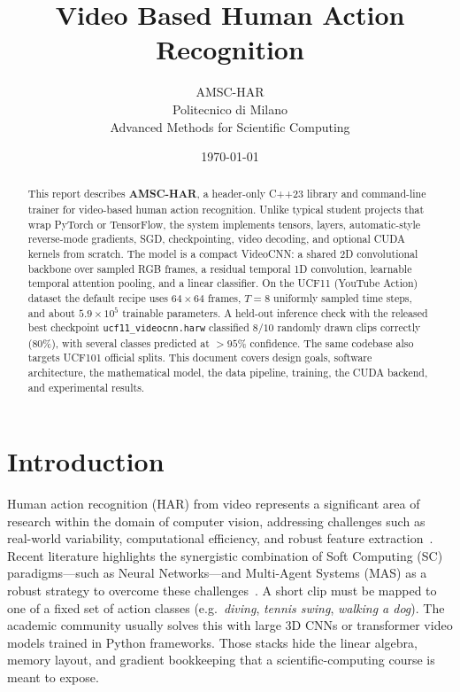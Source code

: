 \documentclass[11pt,a4paper]{article}
\title{\textbf{Video Based Human Action Recognition}}
\author{AMSC-HAR\\
Politecnico di Milano\\
Advanced Methods for Scientific Computing}
\date{\today}
\begin{document}
\maketitle
\vspace{-1.2em}

\begin{abstract}
This report describes \textbf{AMSC-HAR}, a header-only C++23 library and
command-line trainer for video-based human action recognition.
Unlike typical student projects that wrap PyTorch or TensorFlow, the system
implements tensors, layers, automatic-style reverse-mode gradients, SGD,
checkpointing, video decoding, and optional CUDA kernels from scratch.
The model is a compact VideoCNN: a shared 2D convolutional backbone over
sampled RGB frames, a residual temporal 1D convolution, learnable temporal
attention pooling, and a linear classifier.
On the UCF11 (YouTube Action) dataset the default recipe uses $64\times 64$
frames, $T=8$ uniformly sampled time steps, and about $5.9\times 10^5$
trainable parameters.
A held-out inference check with the released best checkpoint
\texttt{ucf11\_videocnn.harw} classified $8/10$ randomly drawn clips
correctly (80\%), with several classes predicted at $>95\%$ confidence.
The same codebase also targets UCF101 official splits.
This document covers design goals, software architecture, the mathematical
model, the data pipeline, training, the CUDA backend, and experimental
results.
\end{abstract}

\tableofcontents
\vspace{0.6em}

\section{Introduction}
\label{sec:intro}

Human action recognition (HAR) from video represents a significant area of research within the domain of computer vision, addressing challenges such as real-world variability, computational efficiency, and robust feature extraction~\cite{houssein2025integrating}. Recent literature highlights the synergistic combination of Soft Computing (SC) paradigms---such as Neural Networks---and Multi-Agent Systems (MAS) as a robust strategy to overcome these challenges~\cite{houssein2025integrating}. A short clip must be mapped to one of a fixed set of action classes (e.g.\ \emph{diving}, \emph{tennis swing}, \emph{walking a dog}). The academic community usually solves this with large 3D CNNs or transformer video models trained in Python frameworks.
Those stacks hide the linear algebra, memory layout, and gradient bookkeeping
that a scientific-computing course is meant to expose.
\end{document}
